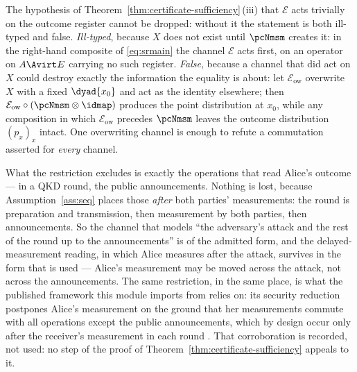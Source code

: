 
\begin{remark}\label{rem:xreg}
The hypothesis of Theorem~\ref{thm:certificate-sufficiency}\,(iii) that $\mathcal{E}$ acts
trivially on the outcome register cannot be dropped: without it the
statement is both ill-typed and false. \emph{Ill-typed}, because $X$ does
not exist until $\pcNmsm$ creates it: in the right-hand composite of
\eqref{eq:srmain} the channel $\mathcal{E}$ acts first, on an operator on
$A\Avirt E$ carrying no such register. \emph{False}, because a channel
that did act on $X$ could destroy exactly the information the equality is
about: let $\mathcal{E}_{\mathrm{ow}}$ overwrite $X$ with a fixed $\dyad{x_0}$ and act
as the identity elsewhere; then $\mathcal{E}_{\mathrm{ow}}\circ(\pcNmsm\otimes\idmap)$
produces the point distribution at $x_0$, while any composition in which
$\mathcal{E}_{\mathrm{ow}}$ precedes $\pcNmsm$ leaves the outcome distribution
$(p_x)_x$ intact. One overwriting channel is enough to refute a
commutation asserted for \emph{every} channel.

What the restriction excludes is exactly the operations that read Alice's
outcome --- in a QKD round, the public announcements. Nothing is lost,
because Assumption~\ref{ass:seq} places those \emph{after} both parties'
measurements: the round is preparation and transmission, then measurement
by both parties, then announcements. So the channel that models ``the
adversary's attack and the rest of the round up to the announcements'' is
of the admitted form, and the delayed-measurement reading, in which Alice
measures after the attack, survives in the form that is used --- Alice's
measurement may be moved across the attack, not across the announcements. The same restriction, in the same place, is
what the published framework this module imports from relies on: its
security reduction postpones Alice's measurement on the ground that her
measurements commute with all operations except the public announcements,
which by design occur only after the receiver's measurement in each round
\cite[Thm.~8.3]{tupkary2026decoy}. That corroboration is recorded, not
used: no step of the proof of Theorem~\ref{thm:certificate-sufficiency} appeals to it.
\end{remark}
